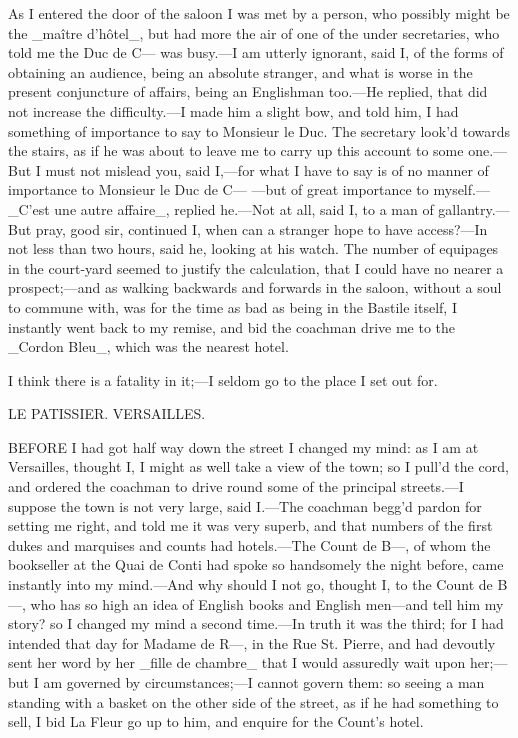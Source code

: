 \documentclass[twoside]{article}
\begin{document}
As I entered the door of the saloon I was met by a person, who possibly
might be the _maître d’hôtel_, but had more the air of one of the under
secretaries, who told me the Duc de C— was busy.—I am utterly ignorant,
said I, of the forms of obtaining an audience, being an absolute
stranger, and what is worse in the present conjuncture of affairs, being
an Englishman too.—He replied, that did not increase the difficulty.—I
made him a slight bow, and told him, I had something of importance to say
to Monsieur le Duc.  The secretary look’d towards the stairs, as if he
was about to leave me to carry up this account to some one.—But I must
not mislead you, said I,—for what I have to say is of no manner of
importance to Monsieur le Duc de C— —but of great importance to
myself.—_C’est une autre affaire_, replied he.—Not at all, said I, to a
man of gallantry.—But pray, good sir, continued I, when can a stranger
hope to have access?—In not less than two hours, said he, looking at his
watch.  The number of equipages in the court-yard seemed to justify the
calculation, that I could have no nearer a prospect;—and as walking
backwards and forwards in the saloon, without a soul to commune with, was
for the time as bad as being in the Bastile itself, I instantly went back
to my remise, and bid the coachman drive me to the _Cordon Bleu_, which
was the nearest hotel.

I think there is a fatality in it;—I seldom go to the place I set out
for.




LE PATISSIER.
VERSAILLES.


BEFORE I had got half way down the street I changed my mind: as I am at
Versailles, thought I, I might as well take a view of the town; so I
pull’d the cord, and ordered the coachman to drive round some of the
principal streets.—I suppose the town is not very large, said I.—The
coachman begg’d pardon for setting me right, and told me it was very
superb, and that numbers of the first dukes and marquises and counts had
hotels.—The Count de B—, of whom the bookseller at the Quai de Conti had
spoke so handsomely the night before, came instantly into my mind.—And
why should I not go, thought I, to the Count de B—, who has so high an
idea of English books and English men—and tell him my story? so I changed
my mind a second time.—In truth it was the third; for I had intended that
day for Madame de R—, in the Rue St. Pierre, and had devoutly sent her
word by her _fille de chambre_ that I would assuredly wait upon her;—but
I am governed by circumstances;—I cannot govern them: so seeing a man
standing with a basket on the other side of the street, as if he had
something to sell, I bid La Fleur go up to him, and enquire for the
Count’s hotel.
\end{document}
